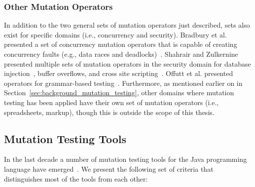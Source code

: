 \subsubsection{Other Mutation Operators}
\label{subsubsec:background_other_operators}
In addition to the two general sets of mutation operators just described, sets also exist for specific domains (i.e., concurrency and security). Bradbury et al. presented a set of concurrency mutation operators that is capable of creating concurrency faults (e.g., data races and deadlocks)~\cite{BCD06}. Shahrair and Zulkernine presented multiple sets of mutation operators in the security domain for database injection~\cite{SZ08b}, buffer overflows\cite{SZ08}, and cross site scripting~\cite{SZ08a}. Offutt et al. presented operators for grammar-based testing~\cite{OAL06}. Furthermore, as mentioned earlier on in Section~\ref{sec:background_mutation_testing}, other domains where mutation testing has been applied have their own set of mutation operators (i.e., spreadsheets, markup), though this is outside the scope of this thesis.


\subsection{Mutation Testing Tools}
\label{subsec:background_mutation_tools}
In the last decade a number of mutation testing tools for the Java programming language have emerged~\cite{JH10}. We present the following set of criteria that distinguishes most of the tools from each other:

